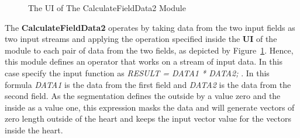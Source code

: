 \documentclass[fleqn,11pt,openany]{book}
\begin{document}
\begin{figure}
\caption{The UI of The CalculateFieldData2 Module}\label{fig:CalculatorModule}
\end{figure}

The {\bf CalculateFieldData2} operates by taking data from the two input fields as two input streams and applying the operation specified inside the {\bf UI} of the module to each pair of data from the two fields, as depicted by Figure~\ref{fig:CalculatorModule}. Hence, this module defines an operator that works on a stream of input data. In this case specify the input function as {\em RESULT = DATA1 * DATA2; }. In this formula {\em DATA1} is the data from the first field and {\em DATA2} is the data from the second field. As the segmentation defines the outside by a value zero and the inside as a value one, this expression masks the data and will generate vectors of zero length outside of the heart and keeps the input vector value for the vectors inside the heart. 
 
\end{document}
